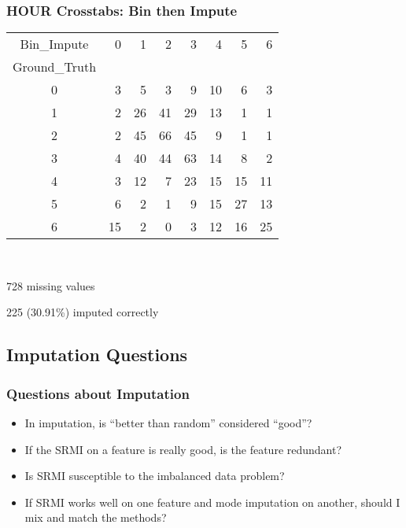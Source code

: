 \begin{frame}[t]
	\frametitle{HOUR Crosstabs:  Bin then Impute}
	\Large


\begin{tabular}{crrrrrrr}
Bin\_Impute &   0 &   1 &   2 &   3 &   4 &   5 &   6 \\
Ground\_Truth &     &     &     &     &     &     &     \\
\hline
0              &   3 &   5 &   3 &   9 &  10 &   6 &   3 \\
1              &   2 &  26 &  41 &  29 &  13 &   1 &   1 \\
2              &   2 &  45 &  66 &  45 &   9 &   1 &   1 \\
3              &   4 &  40 &  44 &  63 &  14 &   8 &   2 \\
4              &   3 &  12 &   7 &  23 &  15 &  15 &  11 \\
5              &   6 &   2 &   1 &   9 &  15 &  27 &  13 \\
6              &  15 &   2 &   0 &   3 &  12 &  16 &  25 \\
\end{tabular}

\

728 missing values

 225 (30.91\%) imputed correctly

\end{frame}

\subsection{Imputation Questions}
\begin{frame}[t]
	\frametitle{Questions about Imputation}
	\Large

	\begin{itemize}
		\item In imputation, is ``better than random'' considered ``good''?
		\item If the SRMI on a feature is really good, is the feature redundant?
		\item Is SRMI susceptible to the imbalanced data problem?
		\item If SRMI works well on one feature and mode imputation on another, should I mix and match the methods?
		
	\end{itemize}

\end{frame}






